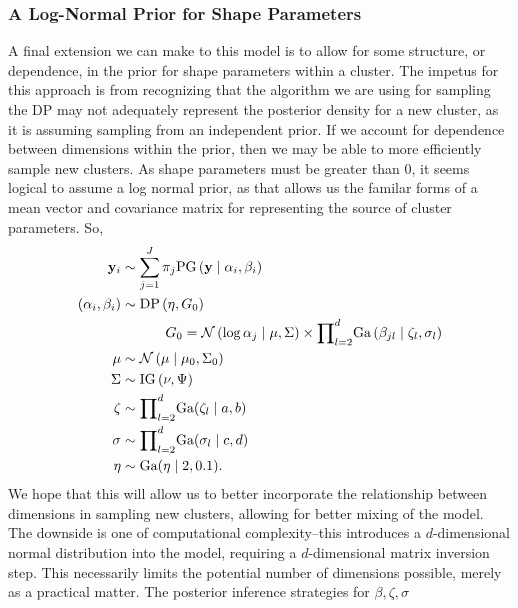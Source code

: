 \subsubsection{A Log-Normal Prior for Shape Parameters}
A final extension we can make to this model is to allow for some structure, or dependence, in the prior
  for shape parameters within a cluster.  The impetus for this approach is from recognizing that the
  algorithm we are using for sampling the DP may not adequately represent the posterior density for
  a new cluster, as it is assuming sampling from an independent prior.  If we account for dependence
  between dimensions within the prior, then we may be able to more efficiently sample new clusters.
  As shape parameters must be greater than 0, it seems logical to assume a log normal prior, as that
  allows us the familar forms of a mean vector and covariance matrix for representing the source of
  cluster parameters. So,
  \begin{equation}
    \label{eqn:dpln}
    \begin{aligned}
      {\bf y}_i &\sim \sum_{j = 1}^J\pi_j\text{PG}\left({\bf y}\mid {\bf \alpha}_i, {\bf \beta}_i\right)\\
      (\alpha_i,\beta_i) &\sim \text{DP}\left(\eta, G_0\right)\\
        &~\hspace{1cm}G_0 = \mathcal{N}\left(\log{\bf \alpha}_{j}\mid\mu,\Sigma\right)\times
            {\small\prod}_{l = 2}^d\text{Ga}\left(\beta_{jl}\mid\zeta_l,\sigma_l\right)\\
      \mu &\sim \mathcal{N}\left(\mu\mid\mu_0,\Sigma_0\right)\\
      \Sigma &\sim \text{IG}\left(\nu,\Psi\right)\\
      {\bf \zeta} &\sim {\small\prod}_{l = 2}^d\text{Ga}(\zeta_l \mid a,b)\\
      {\bf \sigma} &\sim {\small\prod}_{l = 2}^d\text{Ga}(\sigma_l \mid c,d)\\
      {\bf \eta} &\sim \text{Ga}(\eta \mid 2, 0.1).
    \end{aligned}
  \end{equation}
  We hope that this will allow us to better incorporate the relationship between dimensions in
  sampling new clusters, allowing for better mixing of the model.  The downside is one of computational
  complexity--this introduces a $d$-dimensional normal distribution into the model, requiring a
  $d$-dimensional matrix inversion step.  This necessarily limits the potential number of dimensions
  possible, merely as a practical matter.  The posterior inference strategies for $\beta,\zeta,\sigma$
